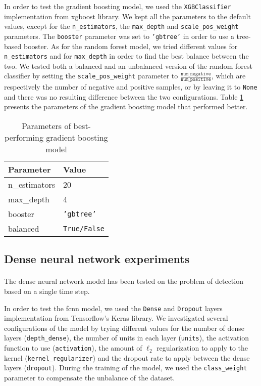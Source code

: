 In order to test the gradient boosting model, we used the \texttt{XGBClassifier} implementation from xgboost library. We kept all the parameters to the default values, except for the \texttt{n\_estimators}, the \texttt{max\_depth} and \texttt{scale\_pos\_weight} parameters. The \texttt{booster} parameter was set to \texttt{'gbtree'} in order to use a tree-based booster. As for the random forest model, we tried different values for \texttt{n\_estimators} and for \texttt{max\_depth} in order to find the best balance between the two. We tested both a balanced and an unbalanced version of the random forest classifier by setting the \texttt{scale\_pos\_weight} parameter to $\frac{\texttt{num\_negative}}{\texttt{num\_positive}}$, which are respectively the number of negative and positive samples, or by leaving it to \texttt{None} and there was no resulting difference between the two configurations. Table \ref{tab:gradientboosting_param} presents the parameters of the gradient boosting model that performed better.
\begin{table}[htbp]
    \centering
    \begin{tabular}{ll}
        \hline
        \textbf{Parameter}  & \textbf{Value} \\\hline
        n\_estimators       & 20 \\
        max\_depth          & 4 \\
        booster             & \texttt{'gbtree'} \\
        balanced            & \texttt{True/False} \\\hline
    \end{tabular}
    \caption{Parameters of best-performing gradient boosting model}
    \label{tab:gradientboosting_param}
\end{table}

\subsection{Dense neural network experiments}
\paragraph{} The dense neural network model has been tested on the problem of detection based on a single time step.

In order to test the \acs{fcnn} model, we used the \texttt{Dense} and \texttt{Dropout} layers implementation from Tensorflow's Keras library. We investigated several configurations of the model by trying different values for the number of dense layers (\texttt{depth\_dense}), the number of units in each layer (\texttt{units}), the activation function to use (\texttt{activation}), the amount of $\ell_2$ regularization to apply to the kernel (\texttt{kernel\_regularizer}) and the dropout rate to apply between the dense layers (\texttt{dropout}). During the training of the model, we used the \texttt{class\_weight} parameter to compensate the unbalance of the dataset.

